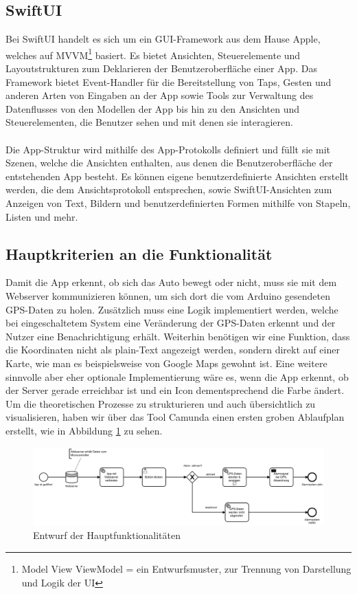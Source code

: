 \subsection{SwiftUI}
Bei SwiftUI handelt es sich um ein GUI-Framework aus dem Hause Apple, welches auf MVVM\footnote{Model View ViewModel = ein Entwurfsmuster, zur Trennung von Darstellung und Logik der UI} basiert.
Es bietet Ansichten, Steuerelemente und Layoutstrukturen zum Deklarieren der Benutzeroberfläche einer App. Das Framework bietet Event-Handler für die Bereitstellung von Taps, Gesten und anderen Arten von Eingaben an der App sowie Tools zur Verwaltung des Datenflusses von den Modellen der App bis hin zu den Ansichten und Steuerelementen, die Benutzer sehen und mit denen sie interagieren.\cite{Inca}
\\
\\
Die App-Struktur wird mithilfe des App-Protokolls definiert und füllt sie mit Szenen, welche die Ansichten enthalten, aus denen die Benutzeroberfläche der entstehenden App besteht. Es können eigene benutzerdefinierte Ansichten erstellt werden, die dem Ansichtsprotokoll entsprechen, sowie  SwiftUI-Ansichten zum Anzeigen von Text, Bildern und benutzerdefinierten Formen mithilfe von Stapeln, Listen und mehr. \cite{Inca}

\subsection{Hauptkriterien an die Funktionalität}

Damit die App erkennt, ob sich das Auto bewegt oder nicht, muss sie mit dem Webserver kommunizieren können, um sich dort die vom Arduino gesendeten GPS-Daten zu holen. Zusätzlich muss eine Logik implementiert werden, welche bei eingeschaltetem System eine Veränderung der GPS-Daten erkennt und der Nutzer eine Benachrichtigung erhält. Weiterhin benötigen wir eine Funktion, dass die Koordinaten  nicht als plain-Text angezeigt werden, sondern direkt auf einer Karte, wie man es beispielsweise von Google Maps gewohnt ist. Eine weitere sinnvolle  aber eher optionale Implementierung wäre es, wenn die App erkennt, ob der Server gerade erreichbar ist und ein Icon dementsprechend die Farbe ändert.  Um die theoretischen Prozesse zu strukturieren und auch übersichtlich zu visualisieren, haben wir über das Tool Camunda einen ersten groben Ablaufplan erstellt, wie in Abbildung \ref{camunda} zu sehen.


\begin{figure} [H]
	\begin{center}
		\includegraphics[width=1\textwidth]{Bilder/iOS_camunda.png}
		\caption{Entwurf der Hauptfunktionalitäten}
		\label{camunda}
	\end{center}
\end{figure}
\clearpage

